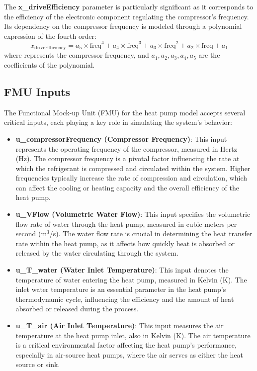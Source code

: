 \documentclass{report}
\begin{document}
The \textbf{x\_driveEfficiency} parameter is particularly significant as it corresponds to the efficiency of the electronic component regulating the compressor's frequency. Its dependency on the compressor frequency is modeled through a polynomial expression of the fourth order:
\begin{equation}
    x_\text{driveEfficiency} = a_5 \times \text{freq}^4 + a_4 \times \text{freq}^3 + a_3 \times \text{freq}^2 + a_2 \times \text{freq} + a_1
\end{equation}
where  represents the compressor frequency, and \(a_1, a_2, a_3, a_4, a_5\) are the coefficients of the polynomial.

\subsection{FMU Inputs }
The Functional Mock-up Unit (FMU) for the heat pump model accepts several critical inputs, each playing a key role in simulating the system's behavior:

\begin{itemize}
    \item \textbf{u\_compressorFrequency (Compressor Frequency)}: This input represents the operating frequency of the compressor, measured in Hertz (Hz). The compressor frequency is a pivotal factor influencing the rate at which the refrigerant is compressed and circulated within the system. Higher frequencies typically increase the rate of compression and circulation, which can affect the cooling or heating capacity and the overall efficiency of the heat pump.

    \item \textbf{u\_VFlow (Volumetric Water Flow)}: This input specifies the volumetric flow rate of water through the heat pump, measured in cubic meters per second (m\(^3\)/s). The water flow rate is crucial in determining the heat transfer rate within the heat pump, as it affects how quickly heat is absorbed or released by the water circulating through the system.

    \item \textbf{u\_T\_water (Water Inlet Temperature)}: This input denotes the temperature of water entering the heat pump, measured in Kelvin (K). The inlet water temperature is an essential parameter in the heat pump's thermodynamic cycle, influencing the efficiency and the amount of heat absorbed or released during the process.

    \item \textbf{u\_T\_air (Air Inlet Temperature)}: This input measures the air temperature at the heat pump inlet, also in Kelvin (K). The air temperature is a critical environmental factor affecting the heat pump's performance, especially in air-source heat pumps, where the air serves as either the heat source or sink.
\end{itemize}
\end{document}
